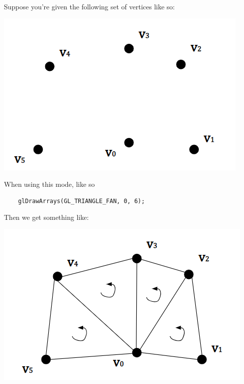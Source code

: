 \documentclass[letterpaper]{article}
\begin{document}
\bigskip

Suppose you're given the following set of vertices like so: 
\begin{center}
    \includegraphics[scale=0.5]{../assets/triangle2.png}
\end{center}

When using this mode, like so 
\begin{verbatim}
    glDrawArrays(GL_TRIANGLE_FAN, 0, 6);
\end{verbatim}
Then we get something like: 
\begin{center}
    \includegraphics[scale=0.5]{../assets/triangle3.png}
\end{center}
\end{document}
